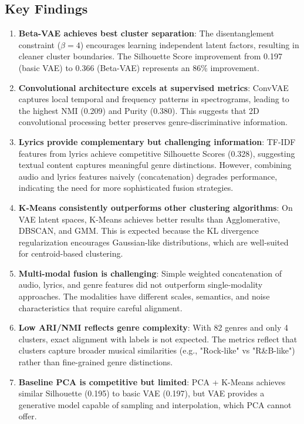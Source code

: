 \documentclass{article}
\begin{document}
\subsection{Key Findings}
\begin{enumerate}
    \item \textbf{Beta-VAE achieves best cluster separation}: The disentanglement constraint ($\beta=4$) encourages learning independent latent factors, resulting in cleaner cluster boundaries. The Silhouette Score improvement from 0.197 (basic VAE) to 0.366 (Beta-VAE) represents an 86\% improvement.
    
    \item \textbf{Convolutional architecture excels at supervised metrics}: ConvVAE captures local temporal and frequency patterns in spectrograms, leading to the highest NMI (0.209) and Purity (0.380). This suggests that 2D convolutional processing better preserves genre-discriminative information.
    
    \item \textbf{Lyrics provide complementary but challenging information}: TF-IDF features from lyrics achieve competitive Silhouette Scores (0.328), suggesting textual content captures meaningful genre distinctions. However, combining audio and lyrics features naively (concatenation) degrades performance, indicating the need for more sophisticated fusion strategies.
    
    \item \textbf{K-Means consistently outperforms other clustering algorithms}: On VAE latent spaces, K-Means achieves better results than Agglomerative, DBSCAN, and GMM. This is expected because the KL divergence regularization encourages Gaussian-like distributions, which are well-suited for centroid-based clustering.
    
    \item \textbf{Multi-modal fusion is challenging}: Simple weighted concatenation of audio, lyrics, and genre features did not outperform single-modality approaches. The modalities have different scales, semantics, and noise characteristics that require careful alignment.
    
    \item \textbf{Low ARI/NMI reflects genre complexity}: With 82 genres and only 4 clusters, exact alignment with labels is not expected. The metrics reflect that clusters capture broader musical similarities (e.g., "Rock-like" vs "R\&B-like") rather than fine-grained genre distinctions.
    
    \item \textbf{Baseline PCA is competitive but limited}: PCA + K-Means achieves similar Silhouette (0.195) to basic VAE (0.197), but VAE provides a generative model capable of sampling and interpolation, which PCA cannot offer.
\end{enumerate}
\end{document}
